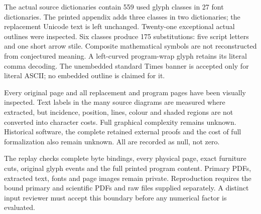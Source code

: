 \documentclass[11pt,a4paper]{article}
\begin{document}
The actual source dictionaries contain 559 used glyph classes in 27 font dictionaries. The printed appendix adds three classes in two dictionaries; the replacement Unicode text is left unchanged. Twenty-one exceptional actual outlines were inspected. Six classes produce 175 substitutions: five script letters and one short arrow stile. Composite mathematical symbols are not reconstructed from conjectured meaning. A left-curved program-wrap glyph retains its literal comma decoding. The unembedded standard Times banner is accepted only for literal ASCII; no embedded outline is claimed for it.

Every original page and all replacement and program pages have been visually inspected. Text labels in the many source diagrams are measured where extracted, but incidence, position, lines, colour and shaded regions are not converted into character costs. Full graphical complexity remains unknown. Historical software, the complete retained external proofs and the cost of full formalization also remain unknown. All are recorded as null, not zero.

The replay checks complete byte bindings, every physical page, exact furniture cuts, original glyph events and the full printed program content. Primary PDFs, extracted text, fonts and page images remain private. Reproduction requires the bound primary and scientific PDFs and raw files supplied separately. A distinct input reviewer must accept this boundary before any numerical factor is evaluated.
\end{document}
